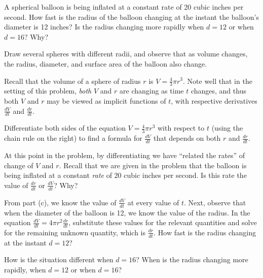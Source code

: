 \begin{pa} \label{PA:3.5}
A spherical balloon is being inflated at a constant rate of 20 cubic inches per second.  How fast is the radius of the balloon changing at the instant the balloon's diameter is 12 inches?  Is the radius changing more rapidly when $d = 12$ or when $d = 16$?  Why?
\ba
	\item Draw several spheres with different radii, and observe that as volume changes, the radius, diameter, and surface area of the balloon also change.  
	\item Recall that the volume of a sphere of radius $r$ is $V = \frac{4}{3} \pi r^3$.  Note well that in the setting of this problem, \emph{both} $V$ and $r$ are changing as time $t$ changes, and thus both $V$ and $r$ may be viewed as implicit functions of $t$, with respective derivatives $\frac{dV}{dt}$ and $\frac{dr}{dt}$.  
	
	Differentiate both sides of the equation $V = \frac{4}{3} \pi r^3$ with respect to $t$ (using the chain rule on the right) to find a formula for $\frac{dV}{dt}$ that depends on both $r$ and $\frac{dr}{dt}$.
	\item At this point in the problem, by differentiating we have ``related the rates'' of change of $V$ and $r$.  Recall that we are given in the problem that the balloon is being inflated at a constant \emph{rate} of 20 cubic inches per second.  Is this rate the value of $\frac{dr}{dt}$ or $\frac{dV}{dt}$?  Why?
	\item From part (c), we know the value of $\frac{dV}{dt}$ at every value of $t$.  Next, observe that when the diameter of the balloon is 12, we know the value of the radius.  In the equation $\frac{dV}{dt} = 4\pi r^2 \frac{dr}{dt}$, substitute these values for the relevant quantities and solve for the remaining unknown quantity, which is $\frac{dr}{dt}$.  How fast is the radius changing at the instant $d = 12$?
	\item How is the situation different when $d = 16$?  When is the radius changing more rapidly, when $d = 12$ or when $d = 16$?
\ea
\end{pa} 
\afterpa